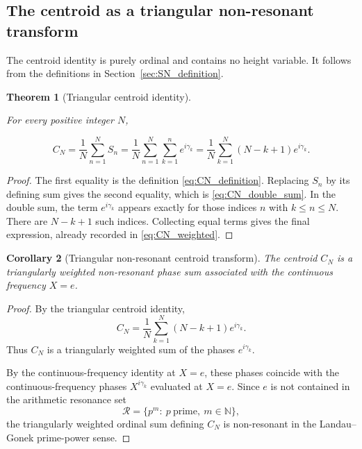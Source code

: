 \documentclass[11pt]{amsart}
\numberwithin{equation}{section}
\theoremstyle{plain}
\newtheorem{theorem}{Theorem}[section]
\newtheorem{corollary}[theorem]{Corollary}
\theoremstyle{definition}
\theoremstyle{remark}
\begin{document}
\subsection{The centroid as a triangular non-resonant transform}
\label{subsec:centroid_triangular_non_resonant_transform}

The centroid identity is purely ordinal and contains no height variable.
It follows from the definitions in Section~\ref{sec:SN_definition}.

\begin{theorem}[Triangular centroid identity]
\label{thm:triangular_centroid_identity}

For every positive integer \(N\),

\begin{equation}
C_N
=
\frac{1}{N}\sum_{n=1}^{N}S_n
=
\frac{1}{N}\sum_{n=1}^{N}\sum_{k=1}^{n}e^{i\gamma_k}
=
\frac{1}{N}\sum_{k=1}^{N}(N-k+1)e^{i\gamma_k}.
\label{eq:triangular_centroid_identity}
\end{equation}

\end{theorem}

\begin{proof}
The first equality is the definition \eqref{eq:CN_definition}. Replacing
\(S_n\) by its defining sum gives the second equality, which is
\eqref{eq:CN_double_sum}. In the double sum, the term
\(e^{i\gamma_k}\) appears exactly for those indices \(n\) with
\(k\leq n\leq N\). There are \(N-k+1\) such indices. Collecting equal
terms gives the final expression, already recorded in
\eqref{eq:CN_weighted}.
\end{proof}

\begin{corollary}[Triangular non-resonant centroid transform]

The centroid \(C_N\) is a triangularly weighted non-resonant phase sum associated with the continuous frequency \(X=e\).

\end{corollary}

\begin{proof}

By the triangular centroid identity,
\begin{equation}
C_N
=
\frac{1}{N}
\sum_{k=1}^{N}
(N-k+1)e^{i\gamma_k}.
\label{eq:triangular_centroid_identity_recalled}
\end{equation}
Thus \(C_N\) is a triangularly weighted sum of the phases \(e^{i\gamma_k}\).

By the continuous-frequency identity at \(X=e\), these phases coincide with the continuous-frequency phases \(X^{i\gamma_k}\) evaluated at \(X=e\). Since \(e\) is not contained in the arithmetic resonance set
\begin{equation}
\mathcal R
=
\{p^m:\ p\ \text{prime},\ m\in\mathbb N\},
\label{eq:prime_power_resonance_set_recalled}
\end{equation}
the triangularly weighted ordinal sum defining \(C_N\) is non-resonant in the Landau--Gonek prime-power sense.

\end{proof}
\end{document}
